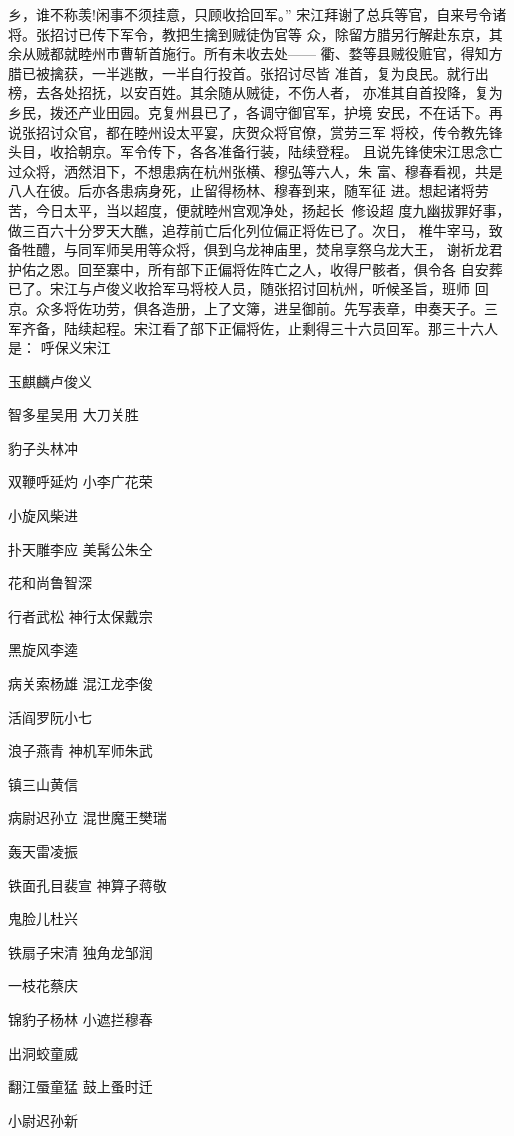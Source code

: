 乡，谁不称羡!闲事不须挂意，只顾收拾回军。”
宋江拜谢了总兵等官，自来号令诸将。张招讨已传下军令，教把生擒到贼徒伪官等
众，除留方腊另行解赴东京，其余从贼都就睦州市曹斩首施行。所有未收去处——
衢、婺等县贼役赃官，得知方腊已被擒获，一半逃散，一半自行投首。张招讨尽皆
准首，复为良民。就行出榜，去各处招抚，以安百姓。其余随从贼徒，不伤人者，
亦准其自首投降，复为乡民，拨还产业田园。克复州县已了，各调守御官军，护境
安民，不在话下。再说张招讨众官，都在睦州设太平宴，庆贺众将官僚，赏劳三军
将校，传令教先锋头目，收拾朝京。军令传下，各各准备行装，陆续登程。
且说先锋使宋江思念亡过众将，洒然泪下，不想患病在杭州张横、穆弘等六人，朱
富、穆春看视，共是八人在彼。后亦各患病身死，止留得杨林、穆春到来，随军征
进。想起诸将劳苦，今日太平，当以超度，便就睦州宫观净处，扬起长，修设超
度九幽拔罪好事，做三百六十分罗天大醮，追荐前亡后化列位偏正将佐已了。次日，
椎牛宰马，致备牲醴，与同军师吴用等众将，俱到乌龙神庙里，焚帛享祭乌龙大王，
谢祈龙君护佑之恩。回至寨中，所有部下正偏将佐阵亡之人，收得尸骸者，俱令各
自安葬已了。宋江与卢俊义收拾军马将校人员，随张招讨回杭州，听候圣旨，班师
回京。众多将佐功劳，俱各造册，上了文簿，进呈御前。先写表章，申奏天子。三
军齐备，陆续起程。宋江看了部下正偏将佐，止剩得三十六员回军。那三十六人是：
呼保义宋江

玉麒麟卢俊义

智多星吴用
大刀关胜

豹子头林冲

双鞭呼延灼
小李广花荣

小旋风柴进

扑天雕李应
美髯公朱仝

花和尚鲁智深

行者武松
神行太保戴宗

黑旋风李逵

病关索杨雄
混江龙李俊

活阎罗阮小七

浪子燕青
神机军师朱武

镇三山黄信

病尉迟孙立
混世魔王樊瑞

轰天雷凌振

铁面孔目裴宣
神算子蒋敬

鬼脸儿杜兴

铁扇子宋清
独角龙邹润

一枝花蔡庆

锦豹子杨林
小遮拦穆春

出洞蛟童威

翻江蜃童猛
鼓上蚤时迁

小尉迟孙新

